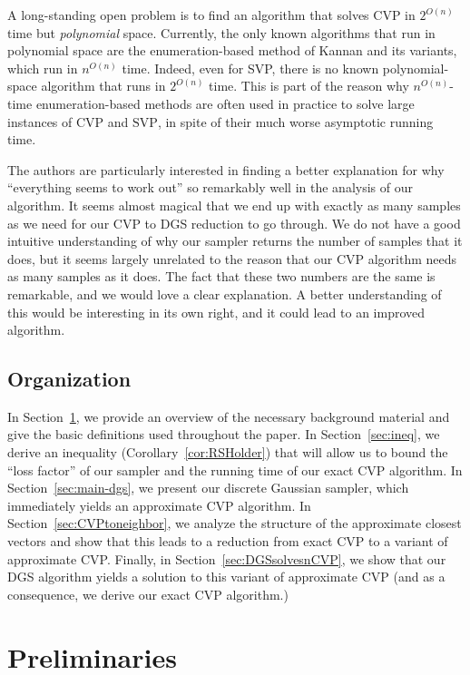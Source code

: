 \documentclass[11pt]{article}
\newcommand{\problem}[1]{\mbox{#1}\xspace}
\newcommand{\scarequotes}[1]{``#1''}
\begin{document}
A long-standing open problem is to find an algorithm that solves $\problem{CVP}$ in $2^{O(n)}$ time but \emph{polynomial} space. Currently, the only known algorithms that run in polynomial space are the enumeration-based method of Kannan and its variants, which run in $n^{O(n)}$ time. Indeed, even for \problem{SVP}, there is no known polynomial-space algorithm that runs in $2^{O(n)}$ time. This is part of the reason why $n^{O(n)}$-time enumeration-based methods are often used in practice to solve large instances of $\problem{CVP}$ and $\problem{SVP}$, in spite of their much worse asymptotic running time.

The authors are particularly interested in finding a better explanation for why \scarequotes{everything seems to work out} so remarkably well in the analysis of our algorithm. It seems almost magical that we end up with exactly as many samples as we need for our \problem{CVP} to \problem{DGS} reduction to go through. We do not have a good intuitive understanding of why our sampler returns the number of samples that it does, but it seems largely unrelated to the reason that our \problem{CVP} algorithm needs as many samples as it does. The fact that these two numbers are the same is remarkable, and we would love a clear explanation. A better understanding of this would be interesting in its own right, and it could lead to an improved algorithm.


\subsection*{Organization}
In Section~\ref{sec:prelims}, we provide an overview of the
necessary background material and give the basic definitions used throughout
the paper. In Section~\ref{sec:ineq}, we derive an inequality (Corollary~\ref{cor:RSHolder}) that will allow us to bound the \scarequotes{loss factor} of our sampler and the running time of our exact \problem{CVP} algorithm. In Section~\ref{sec:main-dgs}, we present our discrete Gaussian sampler, which immediately yields an approximate CVP algorithm. In Section~\ref{sec:CVPtoneighbor}, we analyze the structure of the approximate closest vectors and show that this leads to a reduction from exact CVP to a variant of approximate CVP. Finally, in Section~\ref{sec:DGSsolvesnCVP}, we show that our DGS algorithm yields a solution to this variant of approximate CVP (and as a consequence, we derive our exact CVP algorithm.)

\section{Preliminaries}
\label{sec:prelims}
\end{document}
